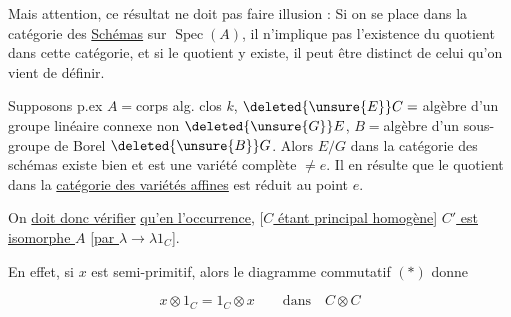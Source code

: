 


Mais attention, ce résultat ne doit pas faire illusion : Si on se place dans la catégorie des \uline{Schémas} sur $\operatorname{Spec}(A)$, il n'implique pas l'existence du quotient dans cette catégorie,  et si le quotient y existe, il peut être distinct de celui qu'on vient de définir.

Supposons p.ex $A={}$corps alg. clos $k$, $\deleted{\unsure{E}}C={}$algèbre  d'un groupe linéaire connexe non  $\deleted{\unsure{G}}E$, $B={}$algèbre d'un sous-groupe de Borel $\deleted{\unsure{B}}G$. Alors $E/G$ dans la catégorie des schémas existe bien et est une variété complète $\ne e$. Il en résulte que le quotient dans la \uline{catégorie des variétés affines} est réduit au point $e$.

On \uline{doit donc vérifier} \uline{qu'en l'occurrence},  [\uline{$C$ étant principal homogène}]  \uline{$C'$ est isomorphe  $A$} \uline{[par $\lambda\to\lambda1_C$]}.

En effet, si $x$ est semi-primitif, alors le diagramme commutatif $(*)$ donne

\[
x\otimes1_C=1_C\otimes x\qquad\text{dans}\quad C\otimes C
\]

